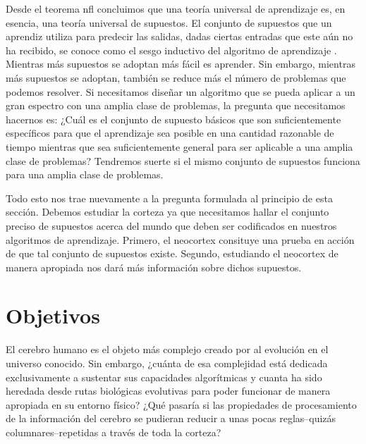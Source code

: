 Desde el teorema \gls{nfl} concluimos que una teoría universal de aprendizaje es,
en esencia, una teoría universal de supuestos.
El conjunto de supuestos que un aprendiz utiliza para predecir las salidas, dadas ciertas entradas
que este aún no ha recibido, se conoce como el sesgo inductivo del algoritmo de aprendizaje \cite{Mitchell80theneed,10.1007/BF00993472}.
Mientras más supuestos se adoptan más fácil es aprender.
Sin embargo, mientras más supuestos se adoptan, también se reduce más el número de problemas que podemos resolver.
Si necesitamos diseñar un algoritmo que se pueda aplicar a un gran espectro con una amplia clase de problemas,
la pregunta que necesitamos hacernos es:
¿Cuál es el conjunto de supuesto básicos que son suficientemente específicos para que el aprendizaje sea posible
en una cantidad razonable de tiempo mientras que sea suficientemente general para ser aplicable a una
amplia clase de problemas?
Tendremos suerte si el mismo conjunto de supuestos funciona para una amplia clase de problemas.

Todo esto nos trae nuevamente a la pregunta formulada al principio de esta sección.
Debemos estudiar la corteza ya que necesitamos hallar el conjunto preciso de supuestos
acerca del mundo que deben ser codificados en nuestros algoritmos de aprendizaje.
Primero, el neocortex consituye una prueba en acción de que tal conjunto de supuestos existe.
Segundo, estudiando el neocortex de manera apropiada nos dará más información sobre dichos supuestos.





















\section{Objetivos}

El cerebro humano es el objeto más complejo creado por al evolución en el universo conocido.
Sin embargo, ¿cuánta de esa complejidad está dedicada exclusivamente a sustentar sus capacidades algorítmicas
y cuanta ha sido heredada desde rutas biológicas evolutivas para poder funcionar de manera apropiada en su
entorno físico?
¿Qué pasaría si las propiedades de procesamiento de la información del cerebro se pudieran reducir a unas pocas
reglas--quizás columnares--repetidas a través de toda la corteza?

